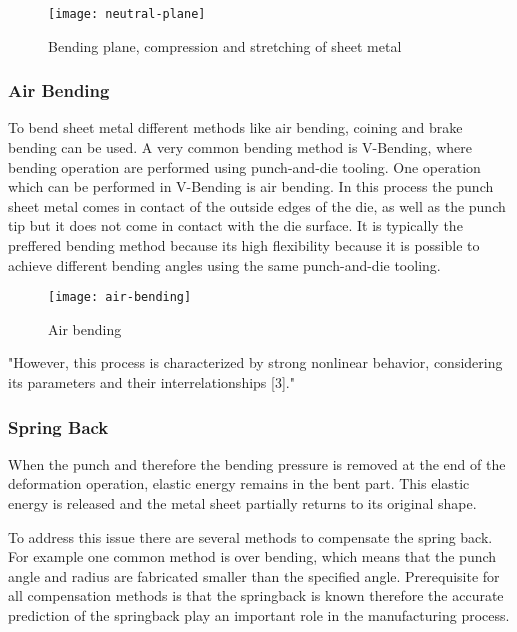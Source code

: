 \begin{figure}[H]
    \centering
    \texttt{[image: neutral-plane]}
    \caption{Bending plane, compression and stretching of sheet metal \cite[p. 3]{baig_machinelearningprediction_2021}}
    \label{fig:neutral-plane}
\end{figure}

\subsubsection{Air Bending}
To bend sheet metal different methods like air bending, coining and brake bending can be used. 
A very common bending method is V-Bending, where bending operation are performed using punch-and-die tooling. One operation which can be performed in V-Bending is air bending.
\cite[p. 416]{groover_fundamentalsmodernmanufacturing_2020}
In this process the punch sheet metal comes in contact of the outside edges of the die, as well as the punch tip but it does not come in contact with the die surface. 
It is typically the preffered bending method because its high flexibility because it is possible to achieve different bending angles using the same punch-and-die tooling.
\cite[p. 1]{cruz_applicationmachinelearning_2021}
\begin{figure}[H]
    \centering
    \texttt{[image: air-bending]}
    \caption{Air bending \cite[p. 416]{groover_fundamentalsmodernmanufacturing_2020}}
    \label{fig:air-bending}
\end{figure}


"However, this process is characterized by strong nonlinear behavior, considering its parameters and their interrelationships [3]." \cite[p. 1]{cruz_applicationmachinelearning_2021}  


\subsubsection{Spring Back} 
When the punch and therefore the bending pressure is removed at the end of the deformation operation, elastic energy remains in the bent part. This elastic energy is released and the metal sheet partially returns to its original shape. \cite[p. 113-114]{groover_fundamentalsmodernmanufacturing_2020} 

To address this issue there are several methods to compensate the spring back. For example one common method is over bending, which means that the punch angle and radius are fabricated smaller than the specified angle. 
\cite[p. 114]{groover_fundamentalsmodernmanufacturing_2020}
Prerequisite for all compensation methods is that the springback is known therefore the accurate prediction of the springback play an important role in the manufacturing process.

